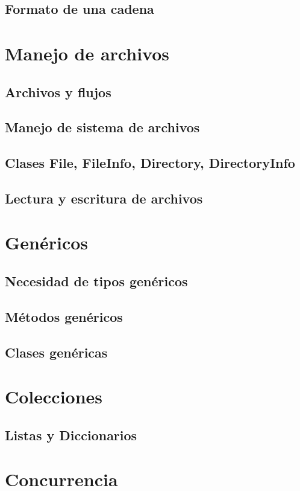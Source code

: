 \documentclass[12pt,a4paper]{report}
\begin{document}
\section{Formato de una cadena}
	
\chapter{Manejo de archivos}
\section{Archivos y flujos}
\section{Manejo de sistema de archivos}
\section{Clases File, FileInfo, Directory, DirectoryInfo}
\section{Lectura y escritura de archivos}

\chapter{Genéricos}
\section{Necesidad de tipos genéricos}
\section{Métodos genéricos}
\section{Clases genéricas}

\chapter{Colecciones}
\section{Listas y Diccionarios}

\chapter{Concurrencia}
\end{document}
